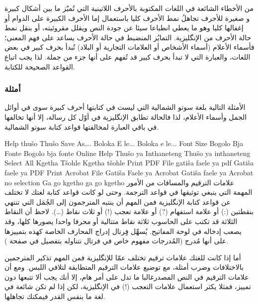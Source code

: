 من الأخطاء الشائعة في اللغات المكتوبة بالأحرف اللاتينية التي تُميّز ما
بين أشكال كبيرة و صغيرة للأحرف تجاهلُ نمط الأحرف كليا باستعمال إما
الأحرف الكبيرة على الدوام أو إغفالها كليا وهو ما يعطي انطباعا سيئا عن
جودة النص ويقلل مقروئيته، أو بنقل نمط حالة الأحرف من الإنگليزية.
التمايُز المنضبط في حالة الأحرف يساعد على فهم المعنى؛ فأسماء الأعلام
(أسماء الأشخاص أو العلامات التجارية أو البلاد) تُبدأ بحرف كبير في بعض
اللغات، والعبارة التي لا تبدأ بحرف كبير قد تُفهم على أنها جزء من جملة.
لذا يجب اتباع القواعد الصحيحة للكتابة. 

\subsubsection{أمثلة}
الأمثلة التالية بلغة سوتو الشمالية التي ليست في كتابتها أحرف كبيرة سوى
في أوائل الجمل وأسماء الأعلام، لذا فالحالة تطابق الإنگليزية في أوّل كل
رسالة، إلا أنها تخالفها في باقي العبارة لمخالفتها قواعد كتابة سوتو
الشمالية.

\starttable[|l|l|l|]
\HL
\NC {} \NC {} \NC
{}\NC\AR
\HL
\NC Help \NC thušo \NC Thušo\NC\AR
\HL
\NC Save As…. \NC Boloka E le... \NC Boloka e le...\NC\AR
\HL
\NC Font Size \NC Bogolo Bja Fonte \NC Bogolo bja fonte\NC\AR
\HL
\NC Online Help \NC Thušo ya Inthaneteng \NC Thušo ya inthaneteng\NC\AR
\HL
\NC Select All \NC Kgetha Tšohle \NC Kgetha tšohle\NC\AR
\HL
\NC Print PDF File \NC gatiša faele ya pdf \NC Gatiša faele ya PDF\NC\AR
\HL
\NC Print Acrobat File \NC Gatiša Faele ya Acrobat \NC Gatiša faele ya
Acrobat\NC\AR
\HL
\NC no selection \NC Ga go kgetho \NC ga go kgetho\NC\AR
\HL
\stoptable
علامات الترقيم والمسافات من الأمور المهمة التي ينبغي توثيقها في قواعد
الترجمة. وحتى لو كانت قواعد كتابة لغتك لا تختلف عن قواعد كتابة
الإنگليزية فمن المهم أن ينتبه المترجمون إلى الجُمَل التي تنتهي بنقطتين
(:) أو علامة استفهام (?) أو علامة تعجب (!) أو ثلاث نقاط (…). لاحظ أن
النقاط الثلاثة قد تكتب على الحاسوب ثلاثة نقاط متتالية أو محرفا واحدا
يصورها كلها، وقد يصعب إدخاله في لوحة المفاتيح. يُسهِّل فِِرتال إدراج
المحارف الخاصة كهذه بتمييزها على أنها مُدرج (المُدرجات مفهوم خاص في
فرتال نتناوله بتفصيل في صفحة ).

أما إذا كانت للغتك علامات ترقيم تختلف عمّا للإنگليزية فمن المهم تذكير
المترجمين بالاختلافات وضرب أمثلة، مع توضيع علامات الترقيم المتطابقة
لتلافي اللبس. ومع أن علامات الترقيم في النص المصدرغالبا ما تدل على أمر
هام، إلا أنك يجب ألا تتبعها دون تمييز، فمثلا يكثر استعمال علامات التعجب
(!) في الإنگليزية، لكن إذا لم تكن شائعة في لغة ما بنفس القدر فيمكنك
تجاهلها.

